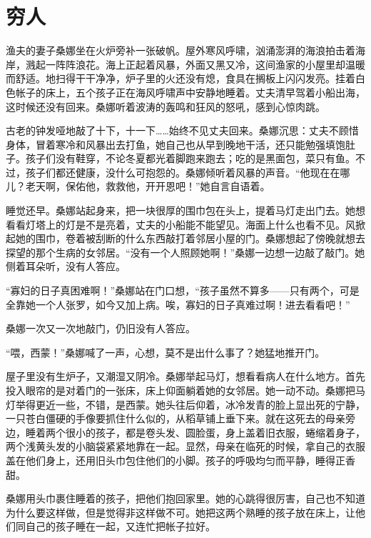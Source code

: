 \documentclass[12pt,UTF-8,openany]{ctexbook}
\begin{document}
\chapter{穷人}

\begin{large}
    
    渔夫的妻子桑娜坐在火炉旁补一张破帆。屋外寒风呼啸，汹涌澎湃的海浪拍击着海岸，溅起一阵阵浪花。海上正起着风暴，外面又黑又冷，这间渔家的小屋里却温暖而舒适。地扫得干干净净，炉子里的火还没有熄，食具在搁板上闪闪发亮。挂着白色帐子的床上，五个孩子正在海风呼啸声中安静地睡着。丈夫清早驾着小船出海，这时候还没有回来。桑娜听着波涛的轰鸣和狂风的怒吼，感到心惊肉跳。
    
    古老的钟发哑地敲了十下，十一下……始终不见丈夫回来。桑娜沉思：丈夫不顾惜身体，冒着寒冷和风暴出去打鱼，她自己也从早到晚地干活，还只能勉强填饱肚子。孩子们没有鞋穿，不论冬夏都光着脚跑来跑去；吃的是黑面包，菜只有鱼。不过，孩子们都还健康，没什么可抱怨的。桑娜倾听着风暴的声音。“他现在在哪儿？老天啊，保佑他，救救他，开开恩吧！”她自言自语着。
    
    睡觉还早。桑娜站起身来，把一块很厚的围巾包在头上，提着马灯走出门去。她想看看灯塔上的灯是不是亮着，丈夫的小船能不能望见。海面上什么也看不见。风掀起她的围巾，卷着被刮断的什么东西敲打着邻居小屋的门。桑娜想起了傍晚就想去探望的那个生病的女邻居。“没有一个人照顾她啊！”桑娜一边想一边敲了敲门。她侧着耳朵听，没有人答应。
    
    “寡妇的日子真困难啊！”桑娜站在门口想，“孩子虽然不算多——只有两个，可是全靠她一个人张罗，如今又加上病。唉，寡妇的日子真难过啊！进去看看吧！”
    
    桑娜一次又一次地敲门，仍旧没有人答应。
    
    “喂，西蒙！”桑娜喊了一声，心想，莫不是出什么事了？她猛地推开门。
    
    屋子里没有生炉子，又潮湿又阴冷。桑娜举起马灯，想看看病人在什么地方。首先投入眼帘的是对着门的一张床，床上仰面躺着她的女邻居。她一动不动。桑娜把马灯举得更近一些，不错，是西蒙。她头往后仰着，冰冷发青的脸上显出死的宁静，一只苍白僵硬的手像要抓住什么似的，从稻草铺上垂下来。就在这死去的母亲旁边，睡着两个很小的孩子，都是卷头发、圆脸蛋，身上盖着旧衣服，蜷缩着身子，两个浅黄头发的小脑袋紧紧地靠在一起。显然，母亲在临死的时候，拿自己的衣服盖在他们身上，还用旧头巾包住他们的小脚。孩子的呼吸均匀而平静，睡得正香甜。
    
    桑娜用头巾裹住睡着的孩子，把他们抱回家里。她的心跳得很厉害，自己也不知道为什么要这样做，但是觉得非这样做不可。她把这两个熟睡的孩子放在床上，让他们同自己的孩子睡在一起，又连忙把帐子拉好。
    

\end{large}
\end{document}
